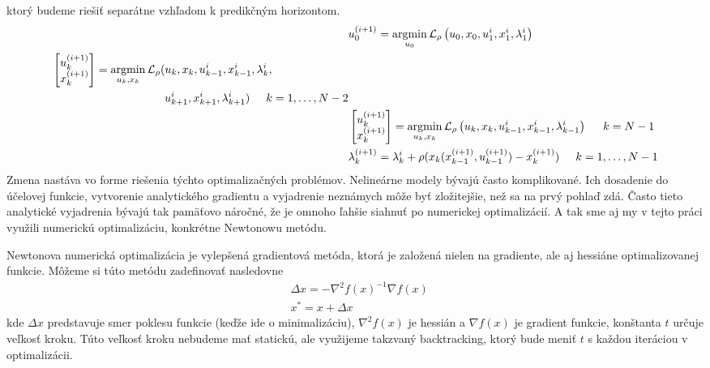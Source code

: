 ktorý budeme riešiť separátne vzhľadom k predikčným horizontom.
\begin{align}
	&u_{0}^{(i+1)} = \argmin_{u_{0}} \mathcal{L}_{\rho} \left(u_0,x_{0},u_1^{i},x_{1}^{i},\lambda_{1}^{i}\right)\\
	\begin{split}
		&\begin{bmatrix}
		u_{k}^{(i+1)} \\
		x_{k}^{(i+1)}
		\end{bmatrix} = 
		\argmin_{u_{k},x_{k}} \mathcal{L}_{\rho} (u_{k},x_{k},u_{k-1}^{i},x_{k-1}^{i},\lambda_{k}^{i},\\
		&\hspace{3.5cm}u_{k+1}^{i},x_{k+1}^{i},\lambda_{k+1}^{i})\hspace{0.5cm} k=1,\dots,N-2
	\end{split}\\
	&\begin{bmatrix}
		u_{k}^{(i+1)} \\
		x_{k}^{(i+1)}
	\end{bmatrix} = \argmin_{u_{k},x_{k}} \mathcal{L}_{\rho} \left(u_{k},x_{k},u_{k-1}^{i},x_{k-1}^{i},\lambda_{k-1}^{i}\right) \hspace{0.5cm} k=N-1\\
	&\lambda_{k}^{(i+1)} = \lambda_{k}^{i} + \rho( x_{k}(x_{k-1}^{(i+1)},u_{k-1}^{(i+1)}) - x_{k}^{(i+1)}) \hspace{0.5cm} k=1,\dots,N-1
\end{align}
Zmena nastáva vo forme riešenia týchto optimalizačných problémov. 
Nelineárne modely bývajú často komplikované. Ich dosadenie do účelovej funkcie, vytvorenie analytického gradientu a vyjadrenie neznámych môže byť zložitejšie, než sa na prvý pohlaď zdá. Často tieto analytické vyjadrenia bývajú tak pamäťovo náročné, že je omnoho ľahšie siahnuť po numerickej optimalizácií. A tak sme aj my v tejto práci využili numerickú optimalizáciu, konkrétne Newtonowu metódu. 

\label{opt:Newton}
Newtonova numerická optimalizácia je vylepšená gradientová metóda, ktorá je založená nielen na gradiente, ale aj hessiáne optimalizovanej funkcie. Môžeme si túto metódu zadefinovať nasledovne
\begin{align}
&\Delta x = -\nabla^{2}f(x)^{-1} \nabla f(x) \\
& x^{*} = x + \Delta x 
\end{align}
kde $\Delta x$ predstavuje smer poklesu funkcie (keďže ide o minimalizáciu), $\nabla^{2}f(x)$ je hessián a $\nabla f(x)$ je gradient funkcie, konštanta $t$ určuje veľkosť kroku. 
Túto veľkosť kroku nebudeme mať statickú, ale využijeme takzvaný backtracking, ktorý bude meniť $t$ s každou iteráciou v optimalizácii.

